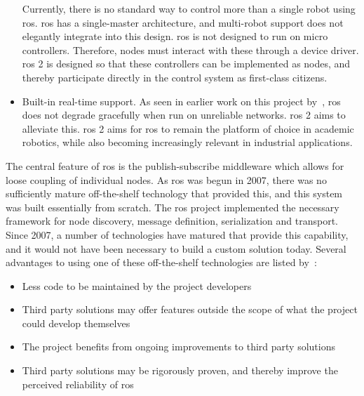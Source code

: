 \documentclass[\rootfolder/main.tex]{subfiles}
\begin{document}
\begin{itemize}
        Currently, there is no standard way to control more than a single robot using \acrshort{ros}.
        \acrshort{ros} has a single-master architecture, and multi-robot support does not elegantly integrate into this design.
        \acrshort{ros} is not designed to run on micro controllers. Therefore, nodes must interact with these through a device driver.
        \acrshort{ros} 2 is designed so that these controllers can be implemented as nodes, and thereby participate directly in the control system as first-class citizens.
    \item{Built-in real-time support.}
        As seen in earlier work on this project by~\cite{Waløen2017}, \acrshort{ros} does not degrade gracefully when run on unreliable networks.
        \acrshort{ros} 2 aims to alleviate this.
        \acrshort{ros} 2 aims for \acrshort{ros} to remain the platform of choice in academic robotics, while also becoming increasingly relevant in industrial applications.
\end{itemize}

The central feature of \acrshort{ros} is the publish-subscribe middleware which allows for loose coupling of individual nodes.
As \acrshort{ros} was begun in 2007, there was no sufficiently mature off-the-shelf technology that provided this, and this system was built essentially from scratch.
The \acrshort{ros} project implemented the necessary framework for node discovery, message definition, serialization and transport.
Since 2007, a number of technologies have matured that provide this capability, and it would not have been necessary to build a custom solution today.
Several advantages to using one of these off-the-shelf technologies are listed by~\cite{Gerkey2017}:

\begin{itemize}
    \item Less code to be maintained by the project developers
    \item Third party solutions may offer features outside the scope of what the project could develop themselves
    \item The project benefits from ongoing improvements to third party solutions
    \item Third party solutions may be rigorously proven, and thereby improve the perceived reliability of \acrshort{ros}
\end{itemize}
\end{document}
